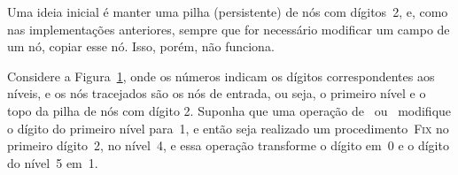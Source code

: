 \documentclass[main.tex]{subfiles}
\begin{document}
\begin{figure}
\centering
{}
\caption{} \label{fig:func_ex1}
\end{figure}

Uma ideia inicial é manter uma pilha (persistente) de nós com dígitos~2, e, como nas implementações anteriores, sempre que for necessário modificar um campo de um nó, copiar esse nó. Isso, porém, não funciona.

Considere a Figura~\ref{fig:func_ex1}, onde os números indicam os dígitos correspondentes aos níveis, e os nós tracejados são os nós de entrada, ou seja, o primeiro nível e o topo da pilha de nós com dígito 2. Suponha que uma operação de~ ou~ modifique o dígito do primeiro nível para~1, e então seja realizado um procedimento~\textsc{Fix} no primeiro dígito~2, no nível~4, e essa operação transforme o dígito em~0 e o dígito do nível~5 em~1.
\end{document}
